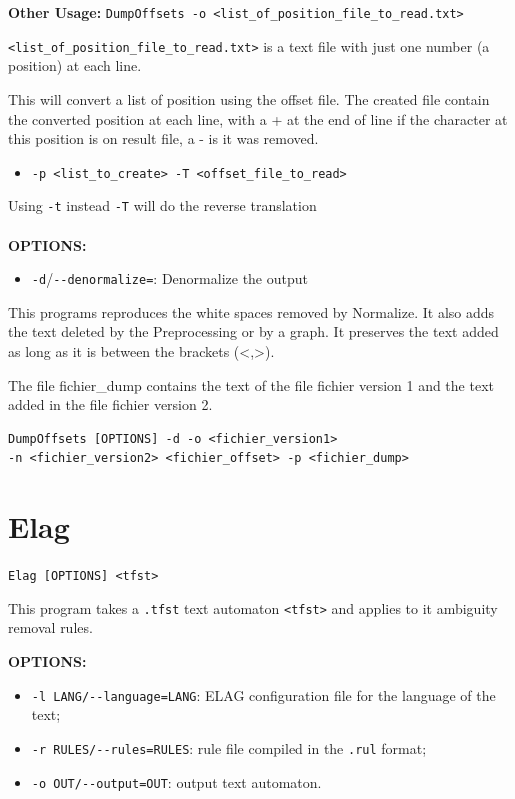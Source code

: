 \bigskip
\noindent \textbf{Other Usage:} \verb+DumpOffsets -o <list_of_position_file_to_read.txt>+

\bigskip
\noindent \verb+<list_of_position_file_to_read.txt>+ is a text file with just one number (a position) at each line.

\bigskip
\noindent This will convert a list of position using the offset file. 	 
	  The created file contain the converted position at each line, with a + at the end of line if the character 	 
	  at this position is on result file, a - is it was removed. 	 
	  	 
\begin{itemize}
  \item \verb+-p <list_to_create> -T <offset_file_to_read>+
\end{itemize} 	 

\noindent Using \verb+-t+ instead \verb+-T+ will do the reverse translation 	 
\\
\\
\noindent \textbf{OPTIONS:}
\begin{itemize} 	 
  \item \verb+-d+/\verb+--denormalize=+: Denormalize the output
\end{itemize} 	
\bigskip
This programs reproduces the white spaces removed by Normalize. It also adds the text deleted by the Preprocessing or by a graph. It preserves the text added as long as it is between the brackets (<,>).

The file fichier\_dump contains the text of the file fichier version 1 and the text added in the file fichier version 2.
\begin{verbatim}
DumpOffsets [OPTIONS] -d -o <fichier_version1>
-n <fichier_version2> <fichier_offset> -p <fichier_dump>
\end{verbatim}
\bigskip

\section{Elag}
\verb+Elag [OPTIONS] <tfst>+

\bigskip
\noindent This program takes a \verb+.tfst+ text automaton \verb+<tfst>+ and
applies to it ambiguity removal rules.

\bigskip
\noindent \textbf{OPTIONS:}
\begin{itemize}
  \item \verb+-l LANG/--language=LANG+: ELAG configuration file for the language of the
  text;
  \item \verb+-r RULES/--rules=RULES+: rule file compiled in the \verb+.rul+
  format; 
  \item \verb+-o OUT/--output=OUT+: output text automaton.
\end{itemize}






